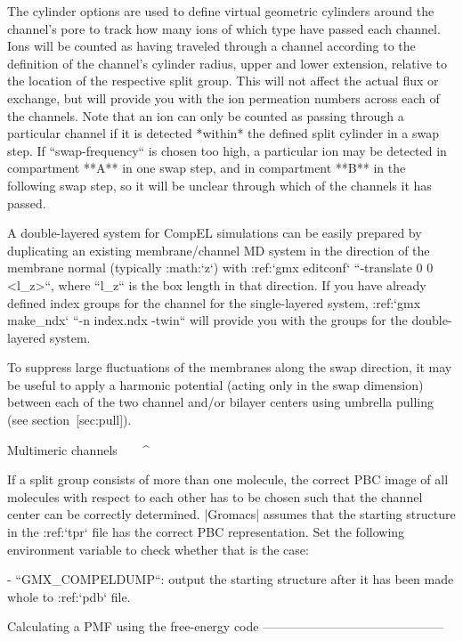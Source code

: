 The cylinder options are used to define virtual geometric cylinders
around the channel’s pore to track how many ions of which type have
passed each channel. Ions will be counted as having traveled through a
channel according to the definition of the channel’s cylinder radius,
upper and lower extension, relative to the location of the respective
split group. This will not affect the actual flux or exchange, but will
provide you with the ion permeation numbers across each of the channels.
Note that an ion can only be counted as passing through a particular
channel if it is detected *within* the defined split cylinder in a swap
step. If ``swap-frequency`` is chosen too high, a particular
ion may be detected in compartment **A** in one swap step, and in
compartment **B** in the following swap step, so it will be unclear
through which of the channels it has passed.

A double-layered system for CompEL simulations can be easily prepared by
duplicating an existing membrane/channel MD system in the direction of
the membrane normal (typically :math:`z`) with 
:ref:`gmx editconf` ``-translate 0 0 <l_z>``, where ``l_z`` is the box
length in that direction. If you have already defined index groups for
the channel for the single-layered system, :ref:`gmx make_ndx`
``-n index.ndx -twin`` will provide you with the groups for the
double-layered system.

To suppress large fluctuations of the membranes along the swap
direction, it may be useful to apply a harmonic potential (acting only
in the swap dimension) between each of the two channel and/or bilayer
centers using umbrella pulling (see section [sec:pull]).

Multimeric channels
^^^^^^^^^^^^^^^^^^^

If a split group consists of more than one molecule, the correct PBC
image of all molecules with respect to each other has to be chosen such
that the channel center can be correctly determined. |Gromacs| assumes
that the starting structure in the :ref:`tpr` file has the
correct PBC representation. Set the following environment variable to
check whether that is the case:

-  ``GMX_COMPELDUMP``: output the starting structure after
   it has been made whole to :ref:`pdb` file.

Calculating a PMF using the free-energy code
--------------------------------------------

